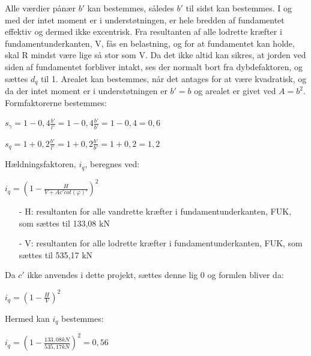 Alle værdier pånær $b'$ kan bestemmes, således $b'$ til sidst kan bestemmes.
\newline
\newline
I og med der intet moment er i understøtningen, er hele bredden af fundamentet effektiv og dermed ikke excentrisk. Fra resultanten af alle lodrette kræfter i fundamentunderkanten, V, fås en belastning, og for at fundamentet kan holde, skal R mindst være lige så stor som V.
\newline
\newline
Da det ikke altid kan sikres, at jorden ved siden af fundamentet forbliver intakt, ses der normalt bort fra dybdefaktoren, og sættes $d_q$ til 1.
\newline
\newline
Arealet kan bestemmes, når det antages for at være kvadratisk, og da der intet moment er i understøtningen er $b'=b$ og arealet er givet ved $A=b^2$.
\newline
\newline
Formfaktorerne bestemmes:
\begin{center}
	$s_\gamma = 1 - 0,\!4 \frac{b'}{l'} = 1 - 0,\!4  \frac{b'}{b'} = 1 - 0,\!4 = 0,\!6$
\end{center}

\begin{center}
	$s_q = 1 + 0,\!2 \frac{b'}{l'} = 1 + 0,\!2 \frac{b'}{b'} = 1 + 0,\!2 = 1,\!2$
\end{center}

Hældningsfaktoren, $i_q$, beregnes ved:
\begin{center}
	$i_q = (1 - \frac{H}{V + A c' cot(\varphi)'})^2$
\end{center}

\begin{itemize}
	\item[-] H: resultanten for alle vandrette kræfter i fundamentunderkanten, FUK, som sættes til 133,08 kN
	\item[-] V: resultanten for alle lodrette kræfter i fundamentunderkanten, FUK, som sættes til 535,17 kN
\end{itemize}

Da $c'$ ikke anvendes i dette projekt, sættes denne lig 0 og formlen bliver da:
\begin{center}
	$i_q = (1 - \frac{H}{V})^2$
\end{center}

Hermed kan $i_q$ bestemmes:
\begin{center}
	$i_q = (1 - \frac{133,\!08 kN}{535,\!17 kN})^2 = 0,\!56$
\end{center}

